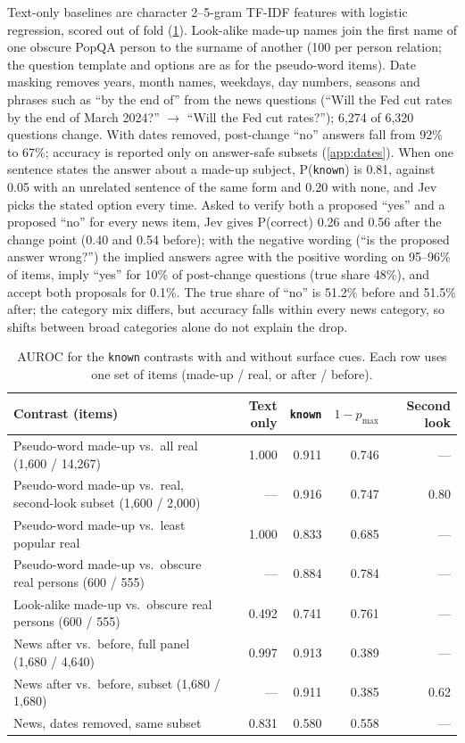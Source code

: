 \documentclass[10pt,twocolumn]{article}
\newcommand{\pmax}{p_{\max}}
\begin{document}
Text-only baselines are character 2--5-gram TF-IDF features with logistic
regression, scored out of fold (\cref{tab:cues}). Look-alike made-up names
join the first name of one obscure PopQA person to the surname of another (100
per person relation; the question template and options are as for the
pseudo-word items). Date masking removes years, month names, weekdays, day
numbers, seasons and phrases such as ``by the end of'' from the news questions
(``Will the Fed cut rates by the end of March 2024?'' $\to$ ``Will the Fed cut
rates?''); 6{,}274 of 6{,}320 questions change. With dates removed,
post-change ``no'' answers fall from 92\% to 67\%; accuracy is reported only on
answer-safe subsets (\cref{app:dates}). When one sentence
states the answer about a made-up subject, P(\texttt{known}) is 0.81, against
0.05 with an unrelated sentence of the same form and 0.20 with none, and Jev
picks the stated option every time. Asked to verify both a proposed ``yes''
and a proposed ``no'' for every news item, Jev gives P(correct) 0.26 and 0.56
after the change point (0.40 and 0.54 before); with the negative wording
(``is the proposed answer wrong?'') the implied answers agree with the positive
wording on 95--96\% of items, imply ``yes'' for 10\% of post-change questions
(true share 48\%), and accept both proposals for 0.1\%. The true share of ``no''
is 51.2\% before and 51.5\% after; the category mix differs, but accuracy falls within
every news category, so shifts between broad categories alone do not explain
the drop.

\begin{table}[h]
\centering\small
\caption{AUROC for the \texttt{known} contrasts with and without surface cues.
Each row uses one set of items (made-up / real, or after / before).}
\label{tab:cues}
\begin{tabular}{@{}l r r r r@{}}
\toprule
Contrast (items) & Text only & \texttt{known} & $1-\pmax$ & Second look \\
\midrule
Pseudo-word made-up vs.\ all real (1{,}600 / 14{,}267) & 1.000 & 0.911 & 0.746 & --- \\
Pseudo-word made-up vs.\ real, second-look subset (1{,}600 / 2{,}000) & --- & 0.916 & 0.747 & 0.80 \\
Pseudo-word made-up vs.\ least popular real & 1.000 & 0.833 & 0.685 & --- \\
Pseudo-word made-up vs.\ obscure real persons (600 / 555) & --- & 0.884 & 0.784 & --- \\
Look-alike made-up vs.\ obscure real persons (600 / 555) & 0.492 & 0.741 & 0.761 & --- \\
News after vs.\ before, full panel (1{,}680 / 4{,}640) & 0.997 & 0.913 & 0.389 & --- \\
News after vs.\ before, subset (1{,}680 / 1{,}680) & --- & 0.911 & 0.385 & 0.62 \\
News, dates removed, same subset & 0.831 & 0.580 & 0.558 & --- \\
\bottomrule
\end{tabular}
\end{table}
\end{document}
